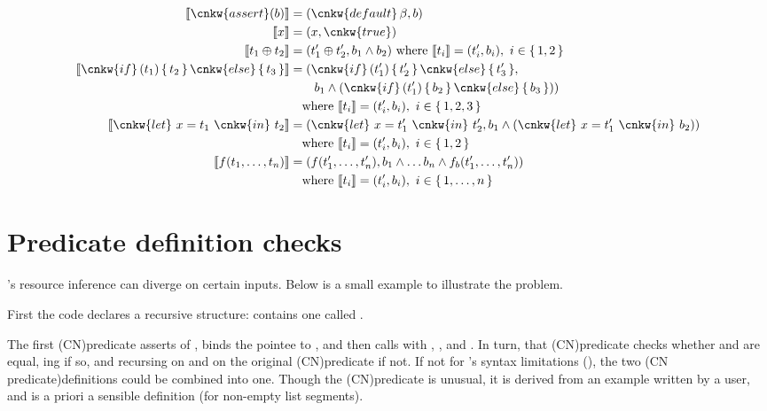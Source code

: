 {\small%
\begin{align*}
    \llbracket \cnkw{assert}(b) \rrbracket &= ( \cnkw{default}\,\beta, b ) \\
    \llbracket x \rrbracket &= ( x, \cnkw{true} ) \\
    \llbracket t_1 \oplus t_2 \rrbracket &= ( t'_1 \oplus t'_2 , b_1 \wedge b_2 )
    \ \text{where}\ \llbracket t_i \rrbracket = ( t'_i , b_i ),\ i \in \{\, 1, 2 \,\} \\
    \llbracket \cnkw{if}\, (t_1) \,\{\, t_2 \,\}\, \cnkw{else} \,\{\, t_3 \,\} \rrbracket &=
        (\cnkw{if}\, (t'_1) \,\{\, t'_2 \,\}\, \cnkw{else} \,\{\, t'_3 \,\}, \\
        & \qquad b_1 \wedge (\cnkw{if}\, (t'_1) \,\{\, b_2 \,\}\, \cnkw{else} \,\{\, b_3 \,\})) \\
        & \quad \text{where}\ \llbracket t_i \rrbracket = ( t'_i , b_i ),\ i \in \{\, 1, 2, 3 \,\} \\
    \llbracket \cnkw{let}\ x = t_1\ \cnkw{in}\ t_2 \rrbracket &=
    (\cnkw{let}\ x = t'_1\ \cnkw{in}\ t'_2, b_1 \wedge (\cnkw{let}\ x = t'_1\ \cnkw{in}\ b_2)) \\
        & \quad \text{where}\ \llbracket t_i \rrbracket = ( t'_i , b_i ),\ i \in \{\, 1, 2 \,\} \\
    \llbracket f (t_1, \ldots, t_n) \rrbracket &=
    (f (t'_1, \ldots, t'_n), b_1 \wedge \ldots b_n \wedge f_b (t'_1, \ldots, t'_n)) \\
        & \quad \text{where}\ \llbracket t_i \rrbracket = ( t'_i , b_i ),\ i \in \{\, 1, \ldots, n \,\} \\
\end{align*}}

\section{Predicate definition checks}\label{sec:pred-defn-checks}

's resource inference can diverge on certain inputs. Below is a small
example to illustrate the problem.


First the code declares a recursive structure:
 contains one  called
.

The first \kl(CN){predicate} asserts  of , binds
the pointee to , and then calls  with
, , and . In turn, that
\kl(CN){predicate} checks whether  and  are equal,
ing if so, and recursing on  and  on the
original \kl(CN){predicate} if not. If not for 's syntax limitations
(), the two \kl(CN predicate){definitions} could be combined
into one. Though the \kl(CN){predicate} is unusual, it is derived from an example
written by a user, and is a priori a sensible
definition (for non-empty list segments).

